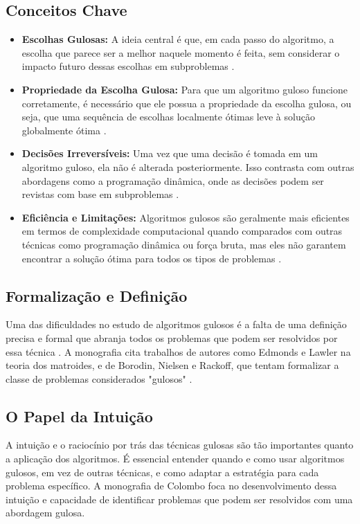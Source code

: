 \documentclass[12pt, a4paper]{report}
\begin{document}
\subsection*{Conceitos Chave}
\begin{itemize}
    \item \textbf{Escolhas Gulosas:} A ideia central é que, em cada passo do algoritmo, a escolha que parece ser a melhor naquele momento é feita, sem considerar o impacto futuro dessas escolhas em subproblemas \cite{Colombo2018}.
    \item \textbf{Propriedade da Escolha Gulosa:} Para que um algoritmo guloso funcione corretamente, é necessário que ele possua a propriedade da escolha gulosa, ou seja, que uma sequência de escolhas localmente ótimas leve à solução globalmente ótima \cite{Colombo2018}.
   \item \textbf{Decisões Irreversíveis:} Uma vez que uma decisão é tomada em um algoritmo guloso, ela não é alterada posteriormente. Isso contrasta com outras abordagens como a programação dinâmica, onde as decisões podem ser revistas com base em subproblemas \cite{Colombo2018}.
   \item \textbf{Eficiência e Limitações:} Algoritmos gulosos são geralmente mais eficientes em termos de complexidade computacional quando comparados com outras técnicas como programação dinâmica ou força bruta, mas eles não garantem encontrar a solução ótima para todos os tipos de problemas \cite{Colombo2018}.
\end{itemize}

\subsection*{Formalização e Definição}
Uma das dificuldades no estudo de algoritmos gulosos é a falta de uma definição precisa e formal que abranja todos os problemas que podem ser resolvidos por essa técnica \cite{Colombo2018}. A monografia cita trabalhos de autores como Edmonds e Lawler na teoria dos matroides, e de Borodin, Nielsen e Rackoff, que tentam formalizar a classe de problemas considerados "gulosos" \cite{Colombo2018}.

\subsection*{O Papel da Intuição}
A intuição e o raciocínio por trás das técnicas gulosas são tão importantes quanto a aplicação dos algoritmos. É essencial entender quando e como usar algoritmos gulosos, em vez de outras técnicas, e como adaptar a estratégia para cada problema específico. A monografia de Colombo \cite{Colombo2018} foca no desenvolvimento dessa intuição e capacidade de identificar problemas que podem ser resolvidos com uma abordagem gulosa.
\end{document}
